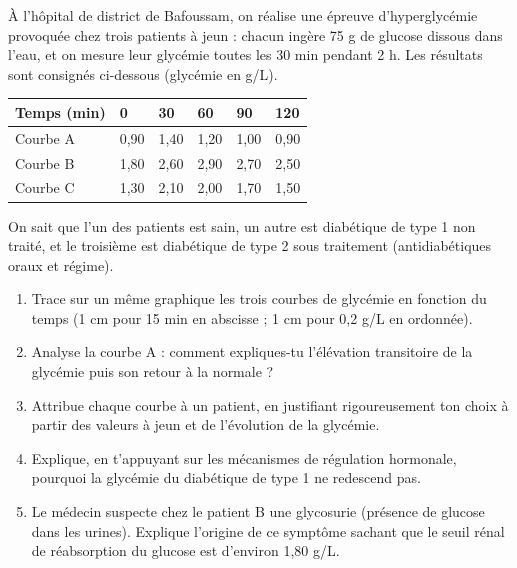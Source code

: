 \documentclass[11pt]{article}
\begin{document}
\begin{exercice}
À l'hôpital de district de Bafoussam, on réalise une épreuve d'hyperglycémie provoquée chez trois patients à jeun : chacun ingère 75 g de glucose dissous dans l'eau, et on mesure leur glycémie toutes les 30 min pendant 2 h. Les résultats sont consignés ci-dessous (glycémie en g/L).
\begin{center}
\begin{tabularx}{\linewidth}{|l|X|X|X|X|X|}
\hline
\rowcolor{popblueL} \textbf{Temps (min)} & \textbf{0} & \textbf{30} & \textbf{60} & \textbf{90} & \textbf{120} \\
\hline
Courbe A & 0,90 & 1,40 & 1,20 & 1,00 & 0,90 \\
\hline
Courbe B & 1,80 & 2,60 & 2,90 & 2,70 & 2,50 \\
\hline
Courbe C & 1,30 & 2,10 & 2,00 & 1,70 & 1,50 \\
\hline
\end{tabularx}
\end{center}
On sait que l'un des patients est sain, un autre est diabétique de type 1 non traité, et le troisième est diabétique de type 2 sous traitement (antidiabétiques oraux et régime).
\begin{enumerate}
\item Trace sur un même graphique les trois courbes de glycémie en fonction du temps (1 cm pour 15 min en abscisse ; 1 cm pour 0,2 g/L en ordonnée).
\item Analyse la courbe A : comment expliques-tu l'élévation transitoire de la glycémie puis son retour à la normale ?
\item Attribue chaque courbe à un patient, en justifiant rigoureusement ton choix à partir des valeurs à jeun et de l'évolution de la glycémie.
\item Explique, en t'appuyant sur les mécanismes de régulation hormonale, pourquoi la glycémie du diabétique de type 1 ne redescend pas.
\item Le médecin suspecte chez le patient B une glycosurie (présence de glucose dans les urines). Explique l'origine de ce symptôme sachant que le seuil rénal de réabsorption du glucose est d'environ 1,80 g/L.
\end{enumerate}
\end{exercice}
\end{document}
